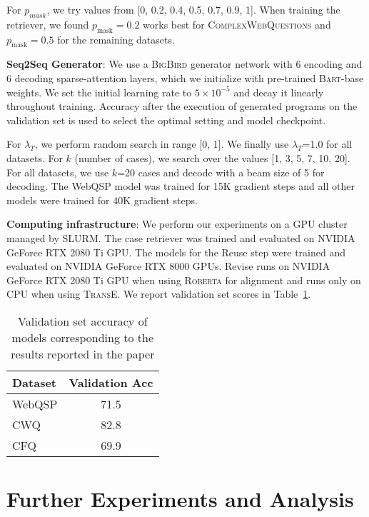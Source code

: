 \documentclass[11pt]{article}
\newcommand{\bigb}{\textsc{BigBird}\xspace}
\newcommand{\cwq}{\textsc{ComplexWebQuestions}\xspace}
\begin{document}
For $p_{mask}$, we try values from [0, 0.2, 0.4, 0.5, 0.7, 0.9, 1]. When training the retriever, we found $p_{\textrm{mask}}=0.2$ works best for \cwq and $p_{\textrm{mask}}=0.5$ for the remaining datasets.

\textbf{Seq2Seq Generator}: We use a \bigb generator network with 6 encoding and 6 decoding sparse-attention layers, which we initialize with pre-trained \textsc{Bart}-base weights. We set the initial learning rate to $5\times 10^{-5}$ and decay it linearly throughout training. Accuracy after the execution of generated programs on the validation set is used to select the optimal setting and model checkpoint.

For $\lambda_T$, we perform random search in range [0, 1]. We finally use $\lambda_T$=1.0 for all datasets. For $k$ (number of cases), we search over the values [1, 3, 5, 7, 10, 20]. For all datasets, we use $k$=20 cases and decode with a beam size of 5 for decoding. The WebQSP model was trained for 15K gradient steps and all other models were trained for 40K gradient steps.

\textbf{Computing infrastructure}: We perform our experiments on a GPU cluster managed by SLURM. The case retriever was trained and evaluated on NVIDIA GeForce RTX 2080 Ti GPU. The models for the Reuse step were trained and evaluated on NVIDIA GeForce RTX 8000 GPUs. Revise runs on NVIDIA GeForce RTX 2080 Ti GPU when using \textsc{Roberta} for alignment and runs only on CPU when using \textsc{TransE}. We report validation set scores in Table~\ref{tab:dev_results}.



\begin{table}[]
    \centering
    \begin{tabular}{l c}\toprule
         Dataset & Validation Acc \\\midrule
         WebQSP & 71.5\\
         CWQ & 82.8 \\
         CFQ & 69.9 \\\bottomrule
    \end{tabular}
    \caption{Validation set accuracy of models corresponding to the results reported in the paper}
    \label{tab:dev_results}
\end{table}


\section{Further Experiments and Analysis}
\label{sec:appendix_further_experiments}
\end{document}
